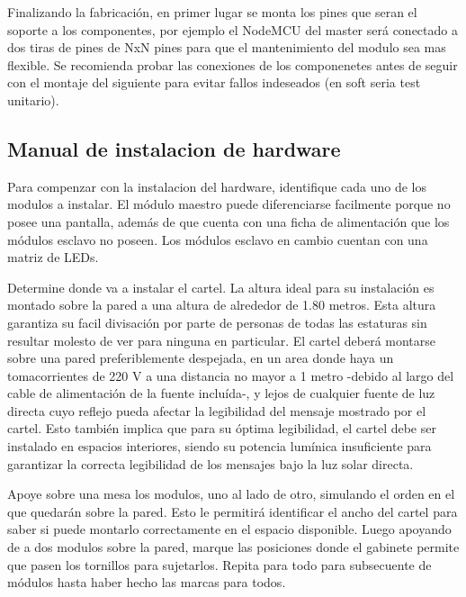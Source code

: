 { \color{red} Finalizando la fabricación, en primer lugar se monta los pines que seran el soporte a los componentes, por ejemplo el NodeMCU del master será conectado a dos tiras de pines de NxN pines para que el mantenimiento del modulo sea mas flexible.
	Se recomienda probar las conexiones de los componenetes antes de seguir con el montaje del siguiente para evitar fallos indeseados (en soft seria test unitario).}



\subsection{Manual de instalacion de hardware}


Para compenzar con la instalacion del hardware, identifique cada uno de los modulos a instalar. El módulo maestro puede diferenciarse facilmente porque no posee una pantalla, además de que cuenta con una ficha de alimentación que los módulos esclavo no poseen. Los módulos esclavo en cambio cuentan con una matriz de LEDs.



Determine donde va a instalar el cartel. La altura ideal para su instalación es montado sobre la pared a una altura de alrededor de 1.80 metros. Esta altura garantiza su facil divisación por parte de personas de todas las estaturas sin resultar molesto de ver para ninguna en particular. El cartel deberá montarse sobre una pared preferiblemente despejada, en un area donde haya un tomacorrientes de 220 V a una distancia no mayor a 1 metro -debido al largo del cable de alimentación de la fuente incluída-, y lejos de cualquier fuente de luz directa cuyo reflejo pueda afectar la legibilidad del mensaje mostrado por el cartel. Esto también implica que para su óptima legibilidad, el cartel debe ser instalado en espacios interiores, siendo su potencia lumínica insuficiente para garantizar la correcta legibilidad de los mensajes bajo la luz solar directa.



Apoye sobre una mesa los modulos, uno al lado de otro, simulando el orden en el que quedarán sobre la pared. Esto le permitirá identificar el ancho del cartel para saber si puede montarlo correctamente en el espacio disponible. Luego apoyando de a dos modulos sobre la pared, marque las posiciones donde el gabinete permite que pasen los tornillos para sujetarlos. Repita para todo para subsecuente de módulos hasta haber hecho las marcas para todos.


